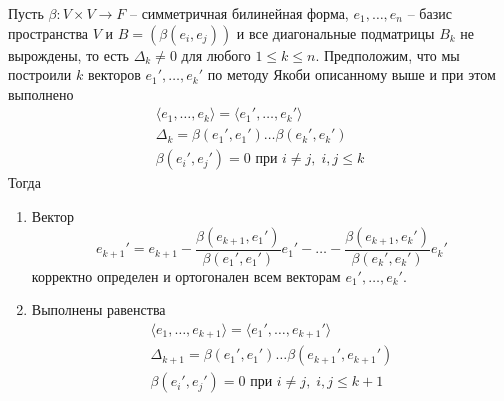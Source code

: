 \begin{claim}
\label{claim::JacobiInvariants}
Пусть $\beta\colon V\times V\to F$ -- симметричная билинейная форма, $e_1,\ldots,e_n$ -- базис пространства $V$ и $B = (\beta(e_i, e_j))$ и все диагональные подматрицы $B_k$ не вырождены, то есть $\Delta_k \neq 0$ для любого $1\leqslant k\leqslant n$.
Предположим, что мы построили $k$ векторов $e_1',\ldots,e_k'$ по методу Якоби описанному выше и при этом выполнено
\begin{gather*}
\langle e_1,\ldots,e_k\rangle = \langle e_1',\ldots, e_k'\rangle\\
\Delta_k = \beta(e_1',e_1') \ldots \beta(e_k',e_k')\\
\beta(e_i',e_j') = 0\text{ при }i\neq j,\;i,j\leqslant k
\end{gather*}
Тогда
\begin{enumerate}
\item Вектор 
\[
e_{k+1}' = e_{k+1} - \frac{\beta(e_{k+1}, e_1')}{\beta(e_1',e_1')}e_1' - \ldots - \frac{\beta(e_{k+1}, e_{k}')}{\beta(e_{k}',e_{k}')}e_{k}'
\]
корректно определен и ортогонален всем векторам $e_1',\ldots,e_k'$.

\item Выполнены равенства
\begin{gather*}
\langle e_1,\ldots,e_{k+1}\rangle = \langle e_1',\ldots, e_{k+1}'\rangle\\
\Delta_{k+1} = \beta(e_1',e_1') \ldots \beta(e_{k+1}',e_{k+1}')\\
\beta(e_i',e_j') = 0\text{ при }i\neq j,\;i,j\leqslant k+1
\end{gather*}
\end{enumerate}
\end{claim}
